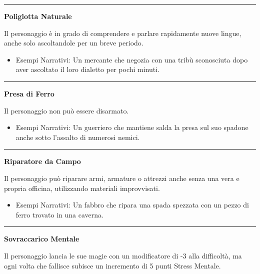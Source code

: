 \documentclass[../manuale_main.tex]{subfiles}
\begin{document}
\vspace{0.5cm}\rule{\textwidth}{0.4pt}\vspace{1cm}

\begin{center}
\textbf{\large{Poliglotta Naturale}}\\
\end{center}
Il personaggio è in grado di comprendere e parlare rapidamente nuove lingue, anche solo ascoltandole per un breve periodo.

\begin{itemize}
\item Esempi Narrativi: Un mercante che negozia con una tribù sconosciuta dopo aver ascoltato il loro dialetto per pochi minuti.
\end{itemize}

\vspace{0.5cm}\rule{\textwidth}{0.4pt}\vspace{1cm}

\begin{center}
\textbf{\large{Presa di Ferro}}\\
\end{center}
Il personaggio non può essere disarmato.

\begin{itemize}
\item Esempi Narrativi: Un guerriero che mantiene salda la presa sul suo spadone anche sotto l'assalto di numerosi nemici.
\end{itemize}

\vspace{0.5cm}\rule{\textwidth}{0.4pt}\vspace{1cm}

\begin{center}
\textbf{\large{Riparatore da Campo}}\\
\end{center}
Il personaggio può riparare armi, armature o attrezzi anche senza una vera e propria officina, utilizzando materiali improvvisati.

\begin{itemize}
\item Esempi Narrativi: Un fabbro che ripara una spada spezzata con un pezzo di ferro trovato in una caverna.
\end{itemize}

\vspace{0.5cm}\rule{\textwidth}{0.4pt}\vspace{1cm}

\begin{center}
\textbf{\large{Sovraccarico Mentale}}\\
\end{center}
Il personaggio lancia le sue magie con un modificatore di -3 alla difficoltà, ma ogni volta che fallisce subisce un incremento di 5 punti Stress Mentale.
\end{document}
